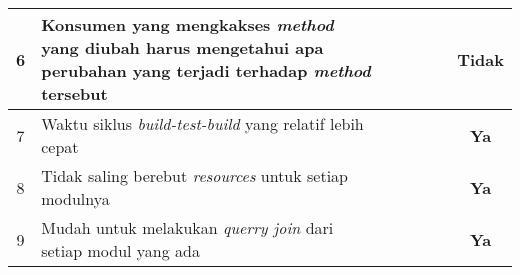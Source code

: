 \begin{table}[H]
\begin{adjustbox}{width=1\textwidth}
\begin{tabular}{|p{1cm}|p{8.5cm}|p{1cm}|p{1cm}|p{1cm}|p{1cm}|p{1cm}|}
			\multicolumn{1}{|c|}{6}&Konsumen yang mengkakses \textit{method} yang diubah harus mengetahui apa perubahan yang terjadi terhadap \textit{method} tersebut&&\checkmark&\checkmark&&\multicolumn{1}{c|}{\textbf{Tidak}}\\ \hline
			\multicolumn{1}{|c|}{7}&Waktu siklus \textit{build-test-build} yang relatif lebih cepat&\checkmark&&&\checkmark&\multicolumn{1}{c|}{\textbf{Ya}}\\ \hline
			\multicolumn{1}{|c|}{8}&Tidak saling berebut \textit{resources} untuk setiap modulnya&\checkmark&&&\checkmark&\multicolumn{1}{c|}{\textbf{Ya}}\\ \hline
			\multicolumn{1}{|c|}{9}&Mudah untuk melakukan \textit{querry join} dari setiap modul yang ada&&\checkmark&\checkmark&&\multicolumn{1}{c|}{\textbf{Ya}}\\ \hline
		\end{tabular}
	\end{adjustbox}
\end{table}

